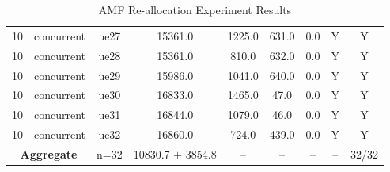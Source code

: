 \begin{table}[ht]
\begin{tabular}{|c|c|c|c|c|c|c|c|c|}
10 & concurrent & ue27 & 15361.0 & 1225.0 & 631.0 & 0.0 & Y & Y \\
10 & concurrent & ue28 & 15361.0 & 810.0 & 632.0 & 0.0 & Y & Y \\
10 & concurrent & ue29 & 15986.0 & 1041.0 & 640.0 & 0.0 & Y & Y \\
10 & concurrent & ue30 & 16833.0 & 1465.0 & 47.0 & 0.0 & Y & Y \\
10 & concurrent & ue31 & 16844.0 & 1079.0 & 46.0 & 0.0 & Y & Y \\
10 & concurrent & ue32 & 16860.0 & 724.0 & 439.0 & 0.0 & Y & Y \\
\multicolumn{2}{|c|}{\textbf{Aggregate}} & n=32 & 10830.7 $\pm$ 3854.8 & -- & -- & -- & -- & 32/32 \\
\hline
\end{tabular}
\caption{AMF Re-allocation Experiment Results}
\label{tab:amf_realloc}
\end{table}
